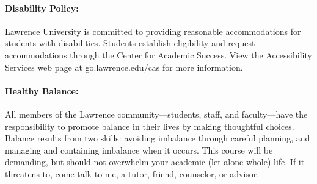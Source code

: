 \documentclass[11pt,]{article}
\begin{document}
\paragraph{Disability Policy:}\label{disability-policy}

Lawrence University is committed to providing reasonable accommodations
for students with disabilities. Students establish eligibility and
request accommodations through the Center for Academic Success. View the
Accessibility Services web page at go.lawrence.edu/cas for more
information.

\paragraph{Healthy Balance:}\label{healthy-balance}

All members of the Lawrence community---students, staff, and
faculty---have the responsibility to promote balance in their lives by
making thoughtful choices. Balance results from two skills: avoiding
imbalance through careful planning, and managing and containing
imbalance when it occurs. This course will be demanding, but should not
overwhelm your academic (let alone whole) life. If it threatens to, come
talk to me, a tutor, friend, counselor, or advisor.
\end{document}
